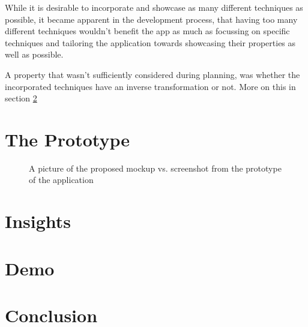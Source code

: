 \documentclass[11pt,a4paper]{article}
\begin{document}
    While it is desirable to incorporate and showcase as many different techniques as possible, it became apparent in the development process, that having too many different techniques wouldn't benefit the app as much as focussing on specific techniques and tailoring the application towards showcasing their properties as well as possible.

    A property that wasn't sufficiently considered during planning, was whether the incorporated techniques have an inverse transformation or not. More on this in section \ref{insights}
  
  \section{The Prototype}
    \begin{figure}
    \vspace{3px}
      \caption{A picture of the proposed mockup vs.  screenshot from the prototype of the application}
    \end{figure}

  \section {Insights}
    \label{insights}

  \section {Demo}
  \section {Conclusion}

  
  




  
\end{document}
